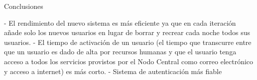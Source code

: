 \begin{conclusions}
    Conclusiones
    
    -   El rendimiento del nuevo sistema es más eficiente ya que en cada iteración añade solo los nuevos usuarios en lugar de borrar y recrear cada noche todos sus usuarios.
    - El tiempo de activación de un usuario (el tiempo que transcurre entre que un usuario es dado de alta por recursos humanas y que el usuario tenga acceso a todos los servicios provistos por el Nodo Central como correo electrónico y acceso a internet) es más corto.
    - Sistema de autenticación más fiable
\end{conclusions}
